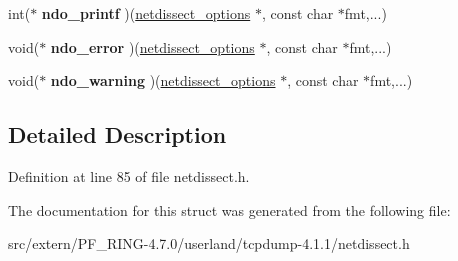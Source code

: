 \begin{DoxyCompactItemize}
\item 
\hypertarget{structnetdissect__options_a553b7c97891050819ffced812e9e3179}{
int($\ast$ {\bfseries ndo\_\-printf} )(\hyperlink{structnetdissect__options}{netdissect\_\-options} $\ast$, const char $\ast$fmt,...)}
\label{structnetdissect__options_a553b7c97891050819ffced812e9e3179}

\item 
\hypertarget{structnetdissect__options_a2af1fb5d322651c33ca3bb768a175d16}{
void($\ast$ {\bfseries ndo\_\-error} )(\hyperlink{structnetdissect__options}{netdissect\_\-options} $\ast$, const char $\ast$fmt,...)}
\label{structnetdissect__options_a2af1fb5d322651c33ca3bb768a175d16}

\item 
\hypertarget{structnetdissect__options_ab187c4b4a08e05a88f02b0749e622703}{
void($\ast$ {\bfseries ndo\_\-warning} )(\hyperlink{structnetdissect__options}{netdissect\_\-options} $\ast$, const char $\ast$fmt,...)}
\label{structnetdissect__options_ab187c4b4a08e05a88f02b0749e622703}

\end{DoxyCompactItemize}


\subsection{Detailed Description}


Definition at line 85 of file netdissect.h.



The documentation for this struct was generated from the following file:\begin{DoxyCompactItemize}
\item 
src/extern/PF\_\-RING-\/4.7.0/userland/tcpdump-\/4.1.1/netdissect.h\end{DoxyCompactItemize}
